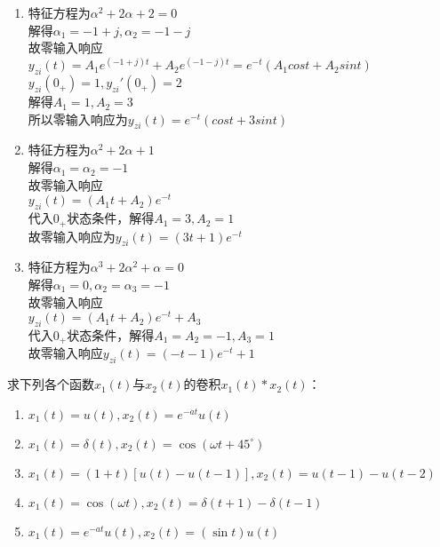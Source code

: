 \documentclass[answers]{exam}
\begin{document}
\begin{questions}
\begin{solution}
\begin{enumerate}[(1)]
	\item 特征方程为$\alpha^2+2\alpha+2=0$\\
	解得$\alpha_1=-1+j,\alpha_2=-1-j$\\
	故零输入响应\\
	$y_{zi}(t)=A_1e^{(-1+j)t}+A_2e^{(-1-j)t}=e^{-t}(A_1cost+A_2sint)$\\
	$y_{zi}(0_+)=1,y_{zi}'(0_+)=2$\\
	解得$A_1=1,A_2=3$\\
	所以零输入响应为$y_{zi}(t)=e^{-t}(cost+3sint)$\\
	\item 特征方程为$\alpha^2+2\alpha+1$\\
	解得$\alpha_1=\alpha_2=-1$\\
	故零输入响应\\
	$y_{zi}(t)=(A_1t+A_2)e^{-t}$\\
	代入$0_+$状态条件，解得$A_1=3,A_2=1$\\
	故零输入响应为$y_{zi}(t)=(3t+1)e^{-t}$\\
	\item 特征方程为$\alpha^3+2\alpha^2+\alpha=0$\\
	解得$\alpha_1=0,\alpha_2=\alpha_3=-1$\\
	故零输入响应\\
	$y_{zi}(t)=(A_1t+A_2)e^{-t}+A_3$\\
	代入$0_+$状态条件，解得$A_1=A_2=-1,A_3=1$\\
	故零输入响应$y_{zi}(t)=(-t-1)e^{-t}+1$\\
\end{enumerate}
\end{solution}



\question 求下列各个函数$x_1(t)$与$x_2(t)$的卷积$x_1(t)\ast x_2(t)$：
\begin{enumerate}[(1)]
	\item $x_1(t)=u(t),x_2(t)=e^{-at}u(t)$
	\item $x_1(t)=\delta(t),x_2(t)=\cos (\omega t + 45^{\circ})$
	\item $x_1(t)=(1+t)\left[u(t)-u(t-1)\right],x_2(t)=u(t-1)-u(t-2)$
	\item $x_1(t)=\cos(\omega t),x_2(t)=\delta(t+1)-\delta(t-1)$
	\item $x_1(t)=e^{-at}u(t),x_2(t)=(\sin t)u(t)$
\end{enumerate}


\end{questions}
\end{document}
